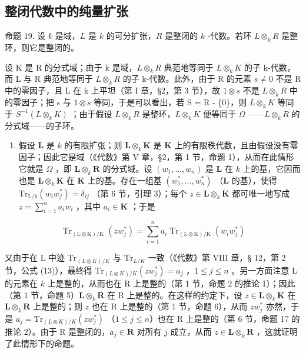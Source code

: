 \subsection{整闭代数中的纯量扩张}

命题 19. 设 \(k\) 是域，\(L\) 是 \(k\) 的可分扩张，\(R\) 是整闭的 \(k\) -代数。若环 \(L \otimes_k R\) 是整环，则它是整闭的。

设 K 是 R 的分式域；由于 k 是域，\(L \otimes_{k} R\) 典范地等同于 \(L \otimes_{k} K\) 的子 k-代数，而 L 与 R 典范地等同于 \(L \otimes_{k} R\) 的子 k-代数。此外，由于 R 的元素 \(s \neq 0\) 不是 R 中的零因子，且 L 在 k 上平坦（第 I 章，§2，第 3 节），故 \(1 \otimes s\) 不是 \(L \otimes_{k} R\) 中的零因子；把 s 与 \(1 \otimes s\) 等同，于是可以看出，若 S = R - \{0\}，则 \(L \otimes_{k} K\) 等同于 \(S^{-1}(L \otimes_{k} K)\) ；由于假设 \(L \otimes_{k} R\) 是整环，\(L \otimes_{k} K\) 便等同于 \(\Omega\) ——\(L \otimes_{k} R\) 的分式域——的子环。

\begin{enumerate}
\def\labelenumi{(\arabic{enumi})}
\tightlist
\item
  假设 \(\mathbf{L}\) 是 \(k\) 的有限扩张；则 \(\mathbf{L} \otimes_k \mathbf{K}\) 是 \(\mathbf{K}\) 上的有限秩代数，且由假设没有零因子；因此它是域（《代数》第 V 章，§2，第 1 节，命题 1），从而在此情形它就是 \(\Omega\) ，即 \(\mathbf{L} \otimes_k \mathbf{R}\) 的分式域。设 \((w_1, \ldots, w_n)\) 是 \(\mathbf{L}\) 在 \(k\) 上的基，它因而也是 \(\mathbf{L} \otimes_k \mathbf{K}\) 在 \(\mathbf{K}\) 上的基。存在一组基 \((w_1^*, \ldots, w_n^*)\) （\(\mathbf{L}\) 的基），使得 \(\mathrm{Tr}_{\mathrm{L/k}}(w_i w_j^*) = \delta_{ij}\) （第 6 节，引理 3）；每个 \(z \in \mathbf{L} \otimes_k \mathbf{K}\) 都可唯一地写成 \(z = \sum_{i=1}^{n} a_i w_i\) ，其中 \(a_i \in \mathbf{K}\) ；于是
\end{enumerate}

\[
\operatorname{Tr} _ {(\mathrm{L} \otimes \mathrm{K}) / \mathrm{K}} (z w _ {j} ^ {*}) = \sum_ {i = 1} ^ {n} a _ {i} \operatorname{Tr} _ {(\mathrm{L} \otimes \mathrm{K}) / \mathrm{K}} (w _ {i} w _ {j} ^ {*})
\]

又由于在 L 中迹 \(\mathrm{Tr}_{(L\otimes K)/K}\) 与 \(\mathrm{Tr}_{L/K}\) 一致（《代数》第 VIII 章，§ 12，第 2 节，公式 (13)），最终得 \(\mathrm{Tr}_{(L\otimes K)/K}(zw_j^*) = a_j\) ，\(1 \leqslant j \leqslant n\) 。另一方面注意 L 的元素在 \(k\) 上是整的，从而也在 R 上是整的（第 1 节，命题 2 的推论 1）；因此（第 1 节，命题 5）\(\mathbf{L} \otimes_k \mathbf{R}\) 在 R 上是整的。在这样的约定下，设 \(z \in \mathbf{L} \otimes_k \mathbf{K}\) 在 \(\mathbf{L} \otimes_k \mathbf{R}\) 上是整的；则 \(z\) 也在 R 上是整的（第 1 节，命题 6），从而 \(zw_j^*\) 亦然，于是 \(a_j = \mathrm{Tr}_{(L\otimes K)/K}(zw_j^*)\) （\(1 \leqslant j \leqslant n\)）也在 R 上是整的（第 6 节，命题 17 的推论 2）。由于 R 是整闭的，\(a_j \in \mathbf{R}\) 对所有 \(j\) 成立，从而 \(z \in \mathbf{L} \otimes_k \mathbf{R}\) ，这就证明了此情形下的命题。


